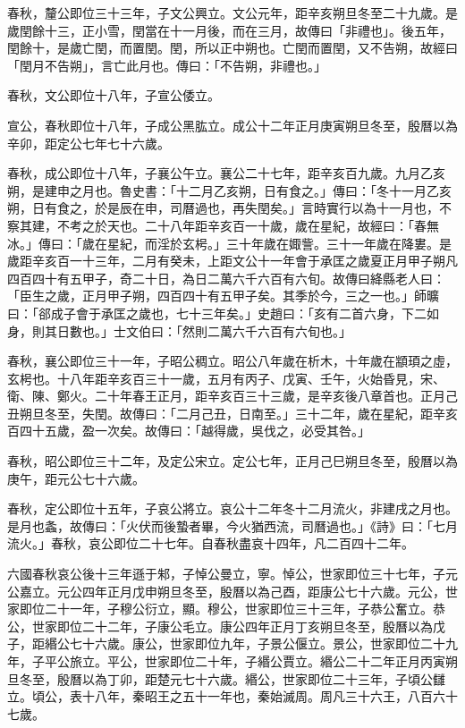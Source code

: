 \begin{pinyinscope}
春秋，釐公即位三十三年，子文公興立。文公元年，距辛亥朔旦冬至二十九歲。是歲閏餘十三，正小雪，閏當在十一月後，而在三月，故傳曰「非禮也」。後五年，閏餘十，是歲亡閏，而置閏。閏，所以正中朔也。亡閏而置閏，又不告朔，故經曰「閏月不告朔」，言亡此月也。傳曰：「不告朔，非禮也。」

春秋，文公即位十八年，子宣公倭立。

宣公，春秋即位十八年，子成公黑肱立。成公十二年正月庚寅朔旦冬至，殷曆以為辛卯，距定公七年七十六歲。

春秋，成公即位十八年，子襄公午立。襄公二十七年，距辛亥百九歲。九月乙亥朔，是建申之月也。魯史書：「十二月乙亥朔，日有食之。」傳曰：「冬十一月乙亥朔，日有食之，於是辰在申，司曆過也，再失閏矣。」言時實行以為十一月也，不察其建，不考之於天也。二十八年距辛亥百一十歲，歲在星紀，故經曰：「春無冰。」傳曰：「歲在星紀，而淫於玄枵。」三十年歲在娵訾。三十一年歲在降婁。是歲距辛亥百一十三年，二月有癸未，上距文公十一年會于承匡之歲夏正月甲子朔凡四百四十有五甲子，奇二十日，為日二萬六千六百有六旬。故傳曰絳縣老人曰：「臣生之歲，正月甲子朔，四百四十有五甲子矣。其季於今，三之一也。」師曠曰：「郤成子會于承匡之歲也，七十三年矣。」史趙曰：「亥有二首六身，下二如身，則其日數也。」士文伯曰：「然則二萬六千六百有六旬也。」

春秋，襄公即位三十一年，子昭公稠立。昭公八年歲在析木，十年歲在顓頊之虛，玄枵也。十八年距辛亥百三十一歲，五月有丙子、戊寅、壬午，火始昏見，宋、衛、陳、鄭火。二十年春王正月，距辛亥百三十三歲，是辛亥後八章首也。正月己丑朔旦冬至，失閏。故傳曰：「二月己丑，日南至。」三十二年，歲在星紀，距辛亥百四十五歲，盈一次矣。故傳曰：「越得歲，吳伐之，必受其咎。」

春秋，昭公即位三十二年，及定公宋立。定公七年，正月己巳朔旦冬至，殷曆以為庚午，距元公七十六歲。

春秋，定公即位十五年，子哀公將立。哀公十二年冬十二月流火，非建戌之月也。是月也螽，故傳曰：「火伏而後蟄者畢，今火猶西流，司曆過也。」《詩》曰：「七月流火。」春秋，哀公即位二十七年。自春秋盡哀十四年，凡二百四十二年。

六國春秋哀公後十三年遜于邾，子悼公曼立，寧。悼公，世家即位三十七年，子元公嘉立。元公四年正月戊申朔旦冬至，殷曆以為己酉，距康公七十六歲。元公，世家即位二十一年，子穆公衍立，顯。穆公，世家即位三十三年，子恭公奮立。恭公，世家即位二十二年，子康公毛立。康公四年正月丁亥朔旦冬至，殷曆以為戊子，距緡公七十六歲。康公，世家即位九年，子景公偃立。景公，世家即位二十九年，子平公旅立。平公，世家即位二十年，子緡公賈立。緡公二十二年正月丙寅朔旦冬至，殷曆以為丁卯，距楚元七十六歲。緡公，世家即位二十三年，子頃公讎立。頃公，表十八年，秦昭王之五十一年也，秦始滅周。周凡三十六王，八百六十七歲。


\end{pinyinscope}
